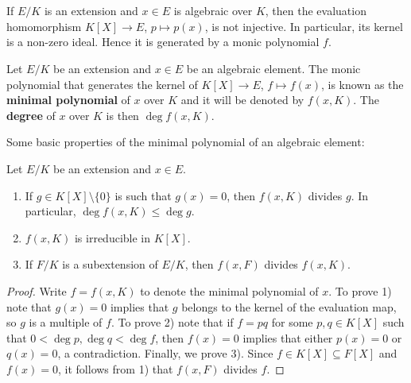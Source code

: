 \chapter{}


If $E/K$ is an extension and $x\in E$ is algebraic
over $K$, then the evaluation homomorphism 
$K[X]\to E$, $p\mapsto p(x)$, is not injective. In particular,
its kernel is a non-zero ideal. Hence 
it is generated by a monic polynomial $f$. 

\begin{definition}
	Let $E/K$ be an extension and $x\in E$ be an algebraic element.  The monic
	polynomial that generates the kernel of $K[X]\to E$, $f\mapsto f(x)$, is
	known as the \textbf{minimal polynomial} of $x$ over $K$ and it will be
	denoted by $f(x,K)$. The \textbf{degree} of $x$ over $K$ is then $\deg
	f(x,K)$. 
\end{definition}

Some basic properties of the minimal polynomial of an algebraic element:

\begin{proposition}
	Let $E/K$ be an extension and $x\in E$. 
	\begin{enumerate}
		\item If $g\in K[X]\setminus\{0\}$ is such that $g(x)=0$, then $f(x,K)$ divides $g$. In particular, 
		$\deg f(x,K)\leq\deg g$. 
		\item $f(x,K)$ is irreducible in $K[X]$.
		\item If $F/K$ is a subextension of $E/K$, then $f(x,F)$ divides
			$f(x,K)$. 
	\end{enumerate}
\end{proposition}

\begin{proof}
	Write $f=f(x,K)$ to denote the minimal polynomial of $x$. 
	To prove 1) note that $g(x)=0$ implies that	$g$ belongs to the kernel of
	the evaluation map, so $g$ is a multiple of $f$. To prove 2) 
	note that if $f=pq$ for some $p,q\in K[X]$ such that
	$0<\deg p,\deg q<\deg f$, then $f(x)=0$ implies that 
	either $p(x)=0$ or $q(x)=0$, a
	contradiction. Finally, we prove 3). Since $f\in K[X]\subseteq F[X]$ 
	and $f(x)=0$, it follows from 1) that $f(x,F)$ divides $f$. 
\end{proof}

